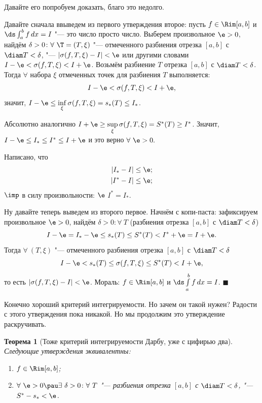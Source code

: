 \documentclass[a4paper,10pt,twoside]{article}
\newtheorem{The}{Теорема}[section]
\newenvironment{Proof}
       {\par\noindent{\textbf{Доказательство.}}}
       {\hfill$\scriptstyle\blacksquare$}
\begin{document}
 Давайте его попробуем доказать, благо это недолго.
 
 \begin{Proof}
 Давайте сначала ввыведем из первого утверждения второе: пусть $f\in\Rim[a,b]$ и $\ds\int_a^bf\,dx=I$ "--- это число просто число.
 Выберем произвольное $\e>0$, найдём $\delta>0\colon\forall\ \T=(T,\xi)$ "--- отмеченного разбиения отрезка $[a,b]$ с $\diam T<\delta$, "--- 
 $|\sigma(f,T,\xi)-I|<\e$ или другими словами $I-\e<\sigma(f,T,\xi)<I+\e$. Возьмём разбиение $T$ отрезка $[a,b]$  с $\diam T<\delta$.
 Тогда $\forall$ набора $\xi$ отмеченных точек для разбиения $T$ выполняется:
 \[I-\e<\sigma(f,T,\xi)<I+\e,\] значит, $I-\e\leq\inf\limits_{\xi}\sigma(f,T,\xi)=s_*(T)\leq I_*$.
 
 Абсолютно аналогично $I+\e\geq\sup\limits_{\xi}\sigma(f,T,\xi)=S^*(T)\geq I^*$. Значит, 
 $I-\e\leq I_*\leq I^*\leq I+\e$ и это верно $\forall\  \e>0.$
 
 Написано, что \begin{align*}
 	|I_*-I|&\leq\e;\\ |I^*-I|&\leq\e;
 \end{align*}$\imp$ в силу произвольности: $\e$ $I^*=I_*$.
 
 Ну давайте теперь выведем из второго первое. Начнём с копи-паста: зафиксируем произвольное $\e>0$, найдём $\delta>0\colon
 \forall\  T$ (разбиения отрезка $[a,b]$ с $\diam T<\delta$)
 $$I-\e=I_*-\e\leq s_*(T)\leq S^*(T)<I^*+\e=I+\e.$$
 Тогда $\forall\  (T,\xi)$ "--- отмеченного разбиения отрезка $[a,b]$ с $\diam T<\delta$
 $$I-\e<s_*(T)\leq\sigma(f,T,\xi)\leq S^*(T)<I+\e,$$
 то есть $|\sigma(f,T,\xi)-I|<\e$. Мораль: $f\in\Rim[a,b]$ и $\ds\int\limits_a^b f\,dx=I$.
 \end{Proof}
 
 Конечно хороший критерий интегрируемости. Но зачем он такой нужен? Радости с этого утверждения пока никакой. Но мы продолжим это утверждение раскручивать.
 
 \begin{The}[Тоже критерий интегрируемости Дарбу, уже с цифирью два]
 	Следующие утверждения эквивалентны:
 	\begin{enumerate}
 	  \item $f\in\Rim[a,b]$;
 	  \item $\forall\ \e>0\pau\exists\ \delta>0\colon \forall\  T$ "--- разбиения отрезка $[a,b]$ с $\diam T<\delta$, "--- $S^*-s_*<\e$.
 	\end{enumerate}
 \end{The}
 
\end{document}
